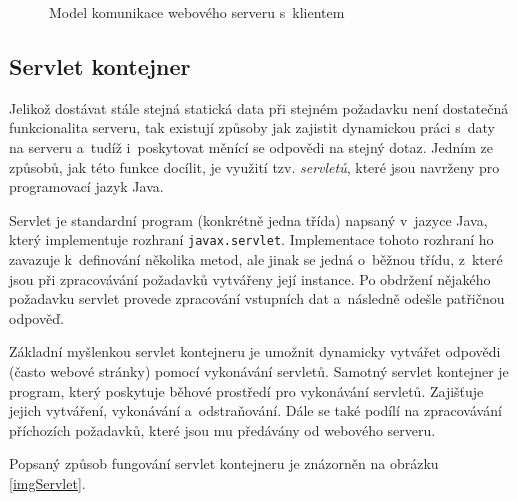             \begin{figure}[ht]
                \begin{center}
                    \caption{Model komunikace webového serveru s~klientem}
                    \label{imgWebserver}
                \end{center}
            \end{figure}    

        \subsection{Servlet kontejner} \label{servletKontejner}
            Jelikož dostávat stále stejná statická data při stejném požadavku není dostatečná funkcionalita serveru,
            tak existují způsoby jak zajistit dynamickou práci s~daty na serveru a~tudíž i~poskytovat
            měnící se odpovědi na stejný dotaz.
            Jedním ze způsobů, jak této funkce docílit, je využití tzv. \emph{servletů},
            které jsou navrženy pro programovací jazyk Java.

            Servlet je standardní program (konkrétně jedna třída) napsaný v~jazyce Java, 
            který implementuje rozhraní \texttt{javax.servlet}.
            Implementace tohoto rozhraní ho zavazuje k~definování několika metod, ale jinak se jedná o~běžnou
            třídu, z~které jsou při zpracovávání požadavků vytvářeny její instance. Po obdržení nějakého
            požadavku servlet provede zpracování vstupních dat a~následně odešle patřičnou odpověď.

            Základní myšlenkou servlet kontejneru je umožnit dynamicky vytvářet odpovědi (často webové stránky)
            pomocí vykonávání servletů. Samotný servlet kontejner je program, který poskytuje běhové prostředí pro vykonávání servletů.
            Zajišťuje jejich vytváření, vykonávání a~odstraňování. Dále se také podílí na zpracovávání příchozích požadavků, které jsou
            mu předávány od webového serveru. 

            Popsaný způsob fungování servlet kontejneru je znázorněn na obrázku \ref{imgServlet}.
            
